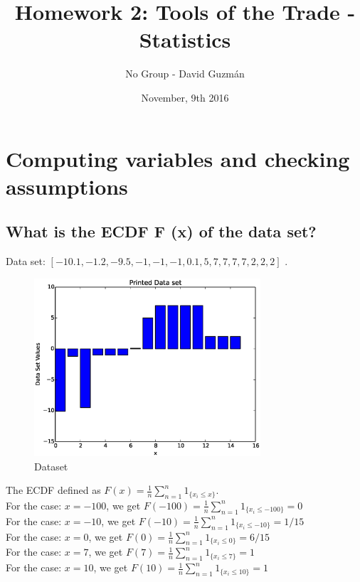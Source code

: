 \documentclass [12 pt , a4paper ] {article}
\begin{document}
\title{\huge \textbf { Homework 2: Tools of the Trade - Statistics}}
\date { November, 9th 2016 }
\author { No Group - David Guzm\'an }
\maketitle
\tableofcontents{}
\newpage
\section{Computing variables and checking assumptions}
\subsection{What is the ECDF F (x) of the data set?}
\par Data set: $[ -10.1,-1.2,-9.5,-1,-1,-1,0.1, 5, 7, 7, 7, 7, 2, 2, 2 ]$ .
\begin{figure}[!ht]
  \centering
  \includegraphics[scale=0.2,width=0.75\textwidth, natwidth=7000,natheight=1000]{ecdf.eps}
  \caption{Dataset}
  \label{fig:Dataset}
\end{figure}
\par The ECDF defined as $F(x)= \frac{1}{n} \sum\limits_{n=1}^{n} 1_{\{x_i\leq x\}}$.
\\ For the case: $x=-100$, we get $F(-100)= \frac{1}{n} \sum\limits_{n=1}^{n} 1_{\{x_i\leq-100\}} = 0$
\\ For the case: $x=-10$, we get $F(-10)= \frac{1}{n} \sum\limits_{n=1}^{n} 1_{\{x_i\leq-10\}} = 1/15$
\\ For the case: $x=0$, we get $F(0)= \frac{1}{n} \sum\limits_{n=1}^{n} 1_{\{x_i\leq0\}} = 6/15$
\\ For the case: $x=7$, we get $F(7)= \frac{1}{n} \sum\limits_{n=1}^{n} 1_{\{x_i\leq7\}} = 1$
\\ For the case: $x=10$, we get $F(10)= \frac{1}{n} \sum\limits_{n=1}^{n} 1_{\{x_i\leq10\}} = 1$
\end{document}
